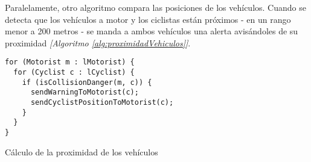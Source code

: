 Paralelamente, otro algoritmo compara las posiciones de los vehículos. Cuando se
detecta que los vehículos a motor y los ciclistas están próximos - en un rango
menor a 200 metros - se manda a ambos vehículos una alerta avisándoles de su proximidad
\emph{[Algoritmo \ref{alg:proximidadVehiculos}]}.

\begin{listing}
	\begin{minipage}{.4\textwidth}
		\begin{verbatim}
for (Motorist m : lMotorist) {
  for (Cyclist c : lCyclist) {
    if (isCollisionDanger(m, c)) {
      sendWarningToMotorist(c);
      sendCyclistPositionToMotorist(c);
    }
  }
}
		\end{verbatim}
	\end{minipage}
	\caption{Cálculo de la proximidad de los vehículos}\label{alg:proximidadVehiculos}
\end{listing}

